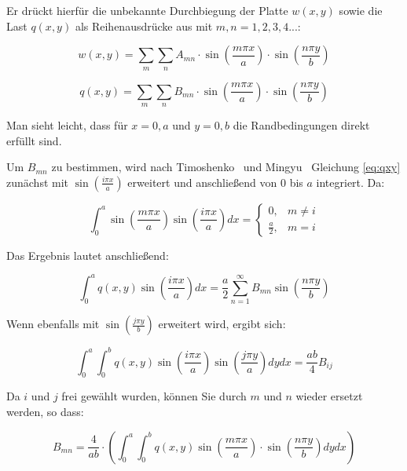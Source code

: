 Er drückt hierfür die unbekannte Durchbiegung der Platte $w(x,y)$ sowie die Last $q(x,y)$ als Reihenausdrücke aus mit $m,n = 1,2,3,4...$:

\begin{equation} 
w(x,y) = \sum_m \sum_n A_{mn} \cdot \sin\left(\dfrac{m \pi x}{a}\right) \cdot \sin\left(\dfrac{n \pi y}{b}\right)
\label{eq:wxy}
\end{equation} 

\begin{equation} 
q(x,y) = \sum_m \sum_n B_{mn} \cdot \sin\left(\dfrac{m \pi x}{a}\right) \cdot \sin\left(\dfrac{n \pi y}{b}\right)
\label{eq:qxy}
\end{equation} 

Man sieht leicht, dass für $x=0,a$ und $y=0,b$ die Randbedingungen direkt erfüllt sind.

Um $B_{mn}$ zu bestimmen, wird nach Timoshenko~\cite{Timoshenko.1922} und Mingyu~\cite{Mingyu.2019} Gleichung \ref{eq:qxy} zunächst mit $\sin{\left( \frac{i \pi x}{a}\right)}$ erweitert und anschließend von $0$ bis $a$ integriert. Da:

\begin{equation}
	\int_0^a \sin{\left( \frac{m \pi x}{a}\right)} \sin{\left( \frac{i \pi x}{a}\right)} dx = 
	\begin{cases}
	0,&  m\neq i\\
	\frac{a}{2},&   m = i 
	\end{cases}
\end{equation}

Das Ergebnis lautet anschließend:

\begin{equation}
	\int_0^a q(x,y) \sin{\left( \frac{i \pi x}{a}\right)} dx = \frac{a}{2} \sum_{n=1}^\infty B_{mn} \sin{\left( \frac{n \pi y}{b}\right)}
\end{equation}

Wenn ebenfalls mit $\sin{\left( \frac{j \pi y}{b}\right)}$ erweitert wird, ergibt sich:


\begin{equation}
\int_0^a \int_0^b q(x,y) \sin{\left( \frac{i \pi x}{a}\right)} \sin{\left( \frac{j \pi y}{a}\right)} dy dx = \frac{ab}{4}  B_{ij} 
\end{equation}


Da $i$ und $j$ frei gewählt wurden, können Sie durch $m$ und $n$ wieder ersetzt werden, so dass:


\begin{equation}
B_{mn} = \dfrac{4}{ab} \cdot \left( \int_0^a \int_0^b q(x,y) 
\sin\left(\dfrac{m \pi x}{a}\right) \cdot \sin\left( \dfrac{n \pi y}{b}\right) dy dx\right)
\label{eq:Bmn_allgemein}
\end{equation}

